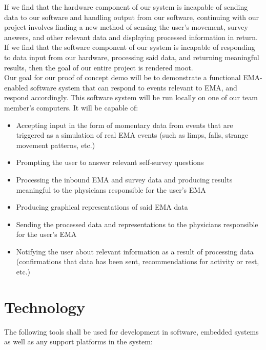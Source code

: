 \documentclass{article}
\begin{document}
If we find that the hardware component of our system is incapable of sending data to our software and handling output from our software, continuing with our project involves finding a new method of sensing the user's movement, survey answers, and other relevant data and displaying processed information in return. If we find that the software component of our system is incapable of responding to data input from our hardware, processing said data, and returning meaningful results, then the goal of our entire project is rendered moot.\\

Our goal for our proof of concept demo will be to demonstrate a functional EMA-enabled software system that can respond to events relevant to EMA, and respond accordingly. This software system will be run locally on one of our team member's computers. It will be capable of:\\

\begin{itemize}
\item Accepting input in the form of momentary data from events that are triggered as a simulation of real EMA events (such as limps, falls, strange movement patterns, etc.)
\item Prompting the user to answer relevant self-survey questions
\item Processing the inbound EMA and survey data and producing results meaningful to the physicians responsible for the user's EMA
\item Producing graphical representations of said EMA data
\item Sending the processed data and representations to the physicians responsible for the user's EMA
\item Notifying the user about relevant information as a result of processing data (confirmations that data has been sent, recommendations for activity or rest, etc.)
\end{itemize}

\section{Technology}
The following tools shall be used for development in software, embedded systems as well as any support platforms in the system:
\end{document}
